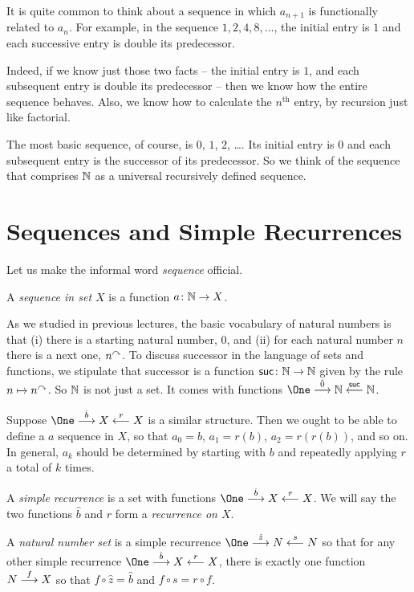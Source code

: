 It is quite common to think about a sequence in which $a_{n+1}$ is functionally related to $a_n$. 
For example, in the sequence $1, 2, 4, 8,\ldots$, the initial entry is $1$ and each successive entry is double its predecessor.

Indeed, if we know just those two facts -- the initial entry is $1$, and each subsequent entry is double its predecessor -- then we know how the entire sequence behaves.
Also, we know how to calculate the $n^{\text{th}}$ entry, by recursion just like factorial.

The most basic sequence, of course, is $0$, $1$, $2$, \ldots. 
Its initial entry is $0$ and each subsequent entry is the successor of its predecessor. 
So we think of the sequence that comprises $\NN$ as a universal recursively defined sequence.

\section{Sequences and Simple Recurrences}

Let us make the informal word \emph{sequence} official.

\begin{defn}
	A \emph{sequence in set $X$} is a function $\fromto a\NN X$.
\end{defn}

As we studied in previous lectures, the basic vocabulary of natural numbers is that (i) there is a starting natural number, $0$, and (ii) for each natural number $n$ there is a next one, $n^\nxt$. 
To discuss successor in the language of sets and functions, we stipulate that successor is a function $\fromto \suc\NN\NN$ given by the rule $n\mapsto n^\nxt$.
So $\NN$ is not just a set. 
It comes with functions $\One \stackrel{\hat{0}}{\longrightarrow} \NN \stackrel{\suc}{\longleftarrow} \NN$.

Suppose $\One\stackrel{\hat{b}}{\longrightarrow}X\stackrel{r}{\longleftarrow}X$ is a similar structure.
Then we ought to be able to define a $a$ sequence in $X$, so that $a_0=b$, $a_1=r(b)$, $a_2=r(r(b))$, and so on. 
In general, $a_k$ should be determined by starting with $b$ and repeatedly applying $r$ a total of $k$ times. 

\begin{defn}\label{def:nno}
	A \emph{simple recurrence} is a set with functions $\One\stackrel{\hat{b}}{\longrightarrow}X\stackrel{r}{\longleftarrow}X$. We will say the two functions $\hat{b}$ and $r$ form a \emph{recurrence on $X$}.
	
	A \emph{natural number set} is a simple recurrence   $\One\stackrel{\hat{z}}{\longrightarrow}N\stackrel{s}{\longleftarrow}N$ so that for any other simple recurrence $\One\stackrel{\hat{b}}{\longrightarrow}X\stackrel{r}{\longleftarrow}X$, there is exactly one function $\sfromto fNX$ so that $f\circ \hat{z} =\hat b$ and $f\circ s = r\circ f$.
\end{defn}

